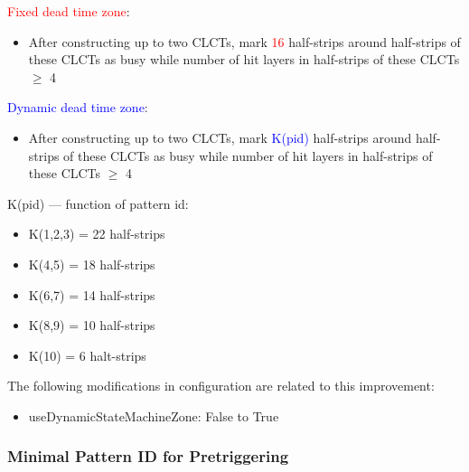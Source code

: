 \textcolor{red}{Fixed dead time zone}:
\begin{itemize}
    \item After constructing up to two CLCTs, mark \textcolor{red}{16} half-strips around half-strips of these CLCTs as busy while number of hit layers in half-strips of these CLCTs $\geq$ 4
\end{itemize}
\textcolor{blue}{Dynamic dead time zone}:
\begin{itemize}
    \item After constructing up to two CLCTs, mark \textcolor{blue}{K(pid)} half-strips around half-strips of these CLCTs as busy while number of hit layers in half-strips of these CLCTs $\geq$ 4
\end{itemize}
\vskip3mm
K(pid) --- function of pattern id:
\begin{itemize}
    \item K(1,2,3) = 22 half-strips
    \item K(4,5) = 18 half-strips
    \item K(6,7) = 14 half-strips
    \item K(8,9) = 10 half-strips
    \item K(10) = 6 halt-strips
\end{itemize}

The following modifications in configuration are related to this improvement:
\begin{itemize}
    \item useDynamicStateMachineZone: False to True
\end{itemize}

\newpage

\subsubsection{Minimal Pattern ID for Pretriggering}

